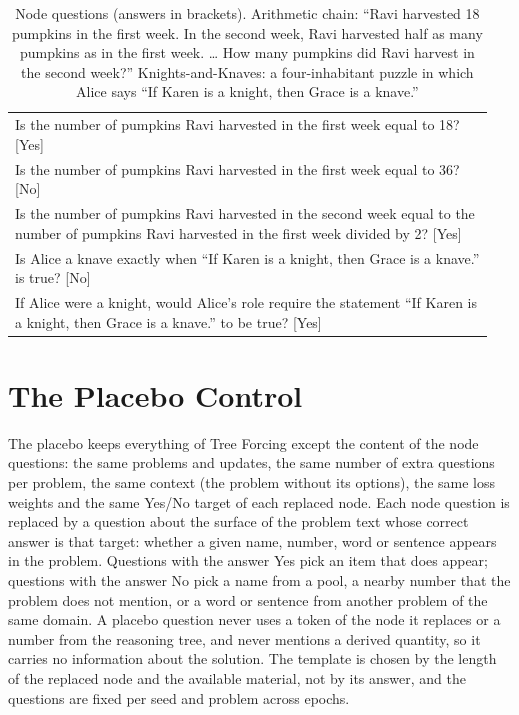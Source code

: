 \documentclass{article}
\newcommand{\tf}{Tree Forcing}
\begin{document}
\begin{table}[h]
\centering
\small
\caption{Node questions (answers in brackets). Arithmetic chain: ``Ravi harvested 18 pumpkins in the first week. In the
second week, Ravi harvested half as many pumpkins as in the first week. \ldots{} How many pumpkins did Ravi harvest in
the second week?'' Knights-and-Knaves: a four-inhabitant puzzle in which Alice says ``If Karen is a knight, then Grace
is a knave.''}
\label{tab:node-examples}
\begin{tabular}{p{0.95\linewidth}}
\toprule
Is the number of pumpkins Ravi harvested in the first week equal to 18? [Yes] \\
Is the number of pumpkins Ravi harvested in the first week equal to 36? [No] \\
Is the number of pumpkins Ravi harvested in the second week equal to the number of pumpkins Ravi harvested in the
first week divided by 2? [Yes] \\
\midrule
Is Alice a knave exactly when ``If Karen is a knight, then Grace is a knave.'' is true? [No] \\
If Alice were a knight, would Alice's role require the statement ``If Karen is a knight, then Grace is a knave.'' to
be true? [Yes] \\
\bottomrule
\end{tabular}
\end{table}

\section{The Placebo Control}
\label{app:placebo}

The placebo keeps everything of \tf{} except the content of the node questions: the same problems and updates, the
same number of extra questions per problem, the same context (the problem without its options), the same loss weights
and the same Yes/No target of each replaced node. Each node question is replaced by a question about the surface of
the problem text whose correct answer is that target: whether a given name, number, word or sentence appears in the
problem. Questions with the answer Yes pick an item that does appear; questions with the answer No pick a name from a
pool, a nearby number that the problem does not mention, or a word or sentence from another problem of the same
domain. A placebo question never uses a token of the node it replaces or a number from the reasoning tree, and never
mentions a derived quantity, so it carries no information about the solution. The template is chosen by the length of
the replaced node and the available material, not by its answer, and the questions are fixed per seed and problem
across epochs.
\end{document}
